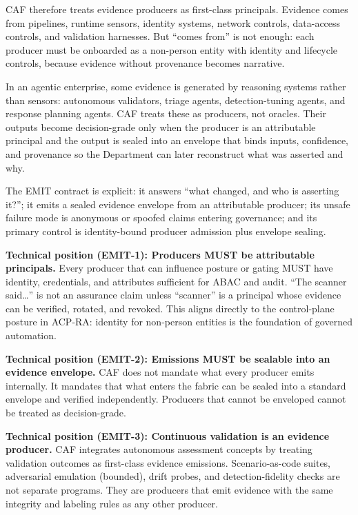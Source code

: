 \documentclass[11pt]{article}
\begin{document}
CAF therefore treats evidence producers as first-class principals.
Evidence comes from pipelines, runtime sensors, identity systems,
network controls, data-access controls, and validation harnesses. But
``comes from'' is not enough: each producer must be onboarded as a
non-person entity with identity and lifecycle controls, because evidence
without provenance becomes narrative.

In an agentic enterprise, some evidence is generated by reasoning systems rather than sensors: autonomous validators, triage agents, detection-tuning agents, and response planning agents. CAF treats these as producers, not oracles. Their outputs become decision-grade only when the producer is an attributable principal and the output is sealed into an envelope that binds inputs, confidence, and provenance so the Department can later reconstruct what was asserted and why.

The EMIT contract is explicit: it answers ``what changed, and who is asserting it?''; it emits a sealed evidence envelope from an attributable producer; its unsafe failure mode is anonymous or spoofed claims entering governance; and its primary control is identity-bound producer admission plus envelope sealing.

\textbf{Technical position (EMIT-1): Producers MUST be attributable
principals.} Every producer that can influence posture or gating MUST
have identity, credentials, and attributes sufficient for ABAC and
audit. ``The scanner said\ldots{}'' is not an assurance claim unless
``scanner'' is a principal whose evidence can be verified, rotated, and
revoked. This aligns directly to the control-plane posture in ACP-RA:
identity for non-person entities is the foundation of governed
automation. \cite{ACPRA}

\textbf{Technical position (EMIT-2): Emissions MUST be sealable into an
evidence envelope.} CAF does not mandate what every producer emits
internally. It mandates that what enters the fabric can be sealed into a
standard envelope and verified independently. Producers that cannot be
enveloped cannot be treated as decision-grade.

\textbf{Technical position (EMIT-3): Continuous validation is an
evidence producer.} CAF integrates autonomous assessment concepts by
treating validation outcomes as first-class evidence emissions.
Scenario-as-code suites, adversarial emulation (bounded), drift probes,
and detection-fidelity checks are not separate programs. They are
producers that emit evidence with the same integrity and labeling rules
as any other producer.
\end{document}
